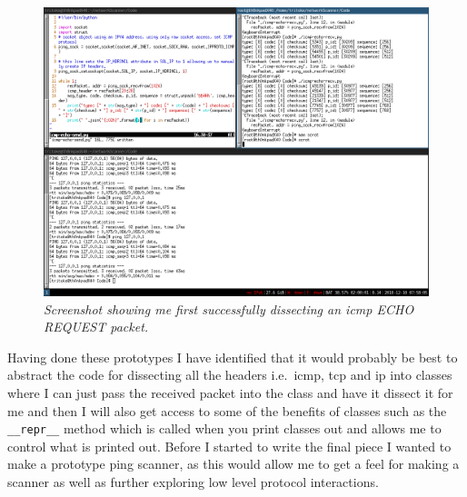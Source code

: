 \documentclass[titlepage]{article}
\begin{document}
\begin{figure}[H]
  \centering
  \includegraphics[width=\textwidth]{local_self_ping.png}
  \caption{\textit{%
    Screenshot showing me first successfully dissecting an \gls{icmp} ECHO REQUEST packet.
}}\label{dissectsuccess}
\end{figure}

Having done these prototypes I have identified that it would probably be best to abstract the
code for dissecting all the headers i.e.\ \gls{icmp}, \gls{tcp} and \gls{ip} into classes
where I can just pass the received packet into the class and have it dissect it for me and then
I will also get access to some of the benefits of classes such as the \verb|__repr__| method
which is called when you print classes out and allows me to control what is printed out.
Before I started to write the final piece I wanted to make a prototype ping scanner, as this
would allow me to get a feel for making a scanner as well as further exploring low level protocol
interactions.
\end{document}
